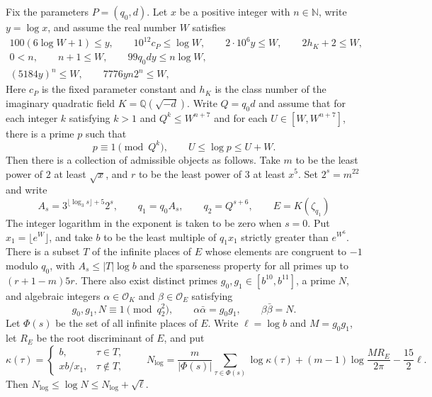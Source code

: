 \begin{lemma}
\label{lem:admissible-construction}
\emitthmsource
Fix the parameters $P=(q_0,d)$. Let $x$ be a positive integer with $n\in\mathbb N$, write $y=\log x$, and assume the real number $W$ satisfies
\[
\begin{gathered}
 100(6\log W+1)\le y,\qquad 10^{12}c_P\le\log W,\qquad
 2\cdot10^6y\le W,\qquad 2h_K+2\le W,\\
 0<n,\qquad n+1\le W,\qquad 99q_0dy\le n\log W,\\
 (5184y)^n\le W,\qquad 7776yn2^n\le W,
\end{gathered}
\]
Here $c_P$ is the fixed parameter constant and $h_K$ is the class number of the imaginary quadratic field $K=\mathbb Q(\sqrt{-d})$. Write $Q=q_0d$ and assume that for each integer $k$ satisfying $k>1$ and $Q^k\le W^{n+7}$ and for each $U\in[W,W^{n+7}]$, there is a prime $p$ such that
\[
 p\equiv1\pmod{Q^k},\qquad U\le\log p\le U+W.
\]
Then there is a collection of admissible objects as follows. Take $m$ to be the least power of $2$ at least $\sqrt{x}$, and $r$ to be the least power of $3$ at least $x^5$. Set $2^s=m^{22}$ and write
\[
 A_s=3^{\lfloor\log_3 s\rfloor+5}2^s,
 \qquad q_1=q_0 A_s,\qquad q_2=Q^{s+6},\qquad E=K(\zeta_{q_1})
\]
The integer logarithm in the exponent is taken to be zero when $s=0$. Put $x_1=\lfloor e^W\rfloor$, and take $b$ to be the least multiple of $q_1x_1$ strictly greater than $e^{W^6}$. There is a subset $T$ of the infinite places of $E$ whose elements are congruent to $-1$ modulo $q_0$, with $A_s\le |T|\log b$ and the sparseness property for all primes up to $(r+1-m)5r$. There also exist distinct primes $g_0,g_1\in[b^{10},b^{11}]$, a prime $N$, and algebraic integers $\alpha\in\mathcal O_K$ and $\beta\in\mathcal O_E$ satisfying
\[
 g_0,g_1,N\equiv1\pmod{q_2^2},\qquad
 \alpha\bar\alpha=g_0g_1,\qquad \beta\bar\beta=N .
\]
Let $\Phi(s)$ be the set of all infinite places of $E$. Write $\ell=\log b$ and $M=g_0g_1$, let $R_E$ be the root discriminant of $E$, and put
\[
 \kappa(\tau)=
 \begin{cases}
 b,&\tau\in T,\\
 xb/x_1,&\tau\notin T,
 \end{cases}
 \qquad
 N_{\log}=\frac{m}{|\Phi(s)|}\sum_{\tau\in\Phi(s)}\log\kappa(\tau)
     +(m-1)\log\frac{MR_E}{2\pi}-\frac{15}{2}\ell .
\]
Then $N_{\log}\le\log N\le N_{\log}+\sqrt \ell$.
\end{lemma}

